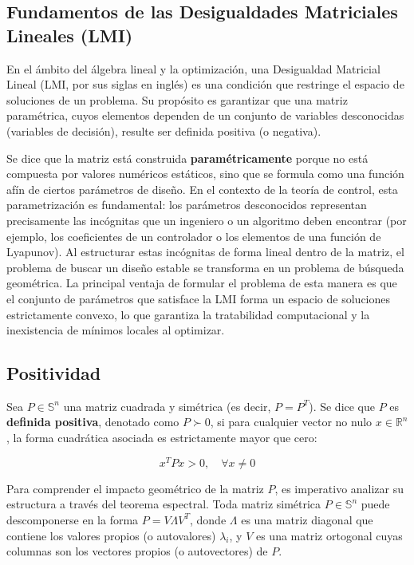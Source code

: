 \subsection{Fundamentos de las Desigualdades Matriciales Lineales (LMI)}

En el ámbito del álgebra lineal y la optimización, una Desigualdad Matricial Lineal (LMI, por sus siglas en inglés) es una condición que restringe el espacio de soluciones de un problema. Su propósito es garantizar que una matriz paramétrica, cuyos elementos dependen de un conjunto de variables desconocidas (variables de decisión), resulte ser definida positiva (o negativa). 

Se dice que la matriz está construida \textbf{paramétricamente} porque no está compuesta por valores numéricos estáticos, sino que se formula como una función afín de ciertos parámetros de diseño. En el contexto de la teoría de control, esta parametrización es fundamental: los parámetros desconocidos representan precisamente las incógnitas que un ingeniero o un algoritmo deben encontrar (por ejemplo, los coeficientes de un controlador o los elementos de una función de Lyapunov). Al estructurar estas incógnitas de forma lineal dentro de la matriz, el problema de buscar un diseño estable se transforma en un problema de búsqueda geométrica. La principal ventaja de formular el problema de esta manera es que el conjunto de parámetros que satisface la LMI forma un espacio de soluciones estrictamente convexo, lo que garantiza la tratabilidad computacional y la inexistencia de mínimos locales al optimizar.

\subsection*{Positividad}
Sea $P \in \mathbb{S}^n$ una matriz cuadrada y simétrica (es decir, $P = P^T$). Se dice que $P$ es \textbf{definida positiva}, denotado como $P \succ 0$, si para cualquier vector no nulo $x \in \mathbb{R}^n$, la forma cuadrática asociada es estrictamente mayor que cero:

\begin{equation}
    x^T P x > 0, \quad \forall x \neq 0
    \label{eq:def_positiva}
\end{equation}

Para comprender el impacto geométrico de la matriz $P$, es imperativo analizar su estructura a través del teorema espectral. Toda matriz simétrica $P \in \mathbb{S}^n$ puede descomponerse en la forma $P = V \Lambda V^T$, donde $\Lambda$ es una matriz diagonal que contiene los valores propios (o autovalores) $\lambda_i$, y $V$ es una matriz ortogonal cuyas columnas son los vectores propios (o autovectores) de $P$.

